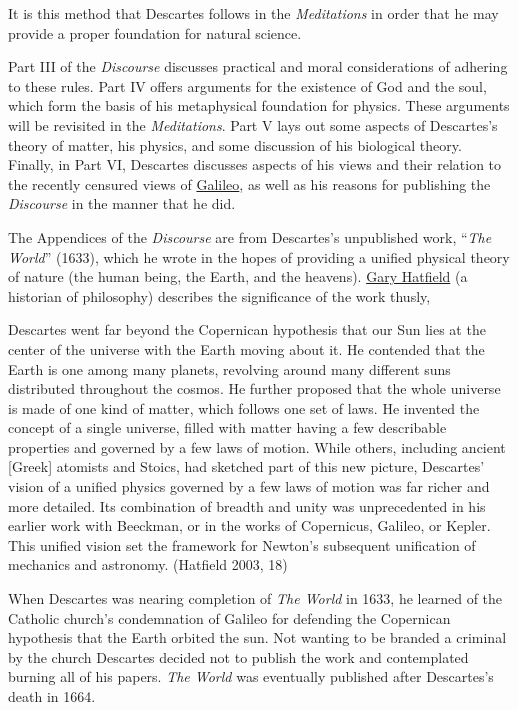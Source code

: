\documentclass[12pt]{article}
\makeatletter
\newcommand{\citeprocitem}[2]{\hyper@linkstart{cite}{citeproc_bib_item_#1}#2\hyper@linkend}
\makeatother
\begin{document}
It is this method that Descartes follows in the \emph{Meditations} in order that he may
provide a proper foundation for natural science.

Part III of the \emph{Discourse} discusses practical and moral considerations of adhering to
these rules. Part IV offers arguments for the existence of God and the soul, which
form the basis of his metaphysical foundation for physics. These arguments will be
revisited in the \emph{Meditations}. Part V lays out some aspects of Descartes's theory of
matter, his physics, and some discussion of his biological theory. Finally, in Part
VI, Descartes discusses aspects of his views and their relation to the recently
censured views of \href{https://plato.stanford.edu/entries/galileo/}{Galileo}, as well as his reasons for publishing the \emph{Discourse} in the
manner that he did.

The Appendices of the \emph{Discourse} are from Descartes's unpublished work, ``\emph{The World}''
(1633), which he wrote in the hopes of providing a unified physical theory of nature
(the human being, the Earth, and the heavens). \href{https://philosophy.sas.upenn.edu/people/gary-hatfield}{Gary Hatfield} (a historian of
philosophy) describes the significance of the work thusly,

\begin{quote-b}
 Descartes went far beyond the Copernican hypothesis that our
Sun lies at the center of the universe with the Earth moving about it. He
contended that the Earth is one among many planets, revolving around many
different suns distributed throughout the cosmos. He further proposed that the
whole universe is made of one kind of matter, which follows one set of laws.
He invented the concept of a single universe, filled with matter having a few
describable properties and governed by a few laws of motion. While others,
including ancient [Greek] atomists and Stoics, had sketched part of this new
picture, Descartes' vision of a unified physics governed by a few laws of
motion was far richer and more detailed. Its combination of breadth and unity
was unprecedented in his earlier work with Beeckman, or in the works of
Copernicus, Galileo, or Kepler. This unified vision set the framework for
Newton's subsequent unification of mechanics and astronomy.
(\citeprocitem{5}{Hatfield 2003, 18})
\end{quote-b}

When Descartes was nearing completion of \emph{The World} in 1633, he learned of the
Catholic church's condemnation of Galileo for defending the Copernican hypothesis
that the Earth orbited the sun. Not wanting to be branded a criminal by the church
Descartes decided not to publish the work and contemplated burning all of his papers.
\emph{The World} was eventually published after Descartes's death in 1664.
\end{document}
